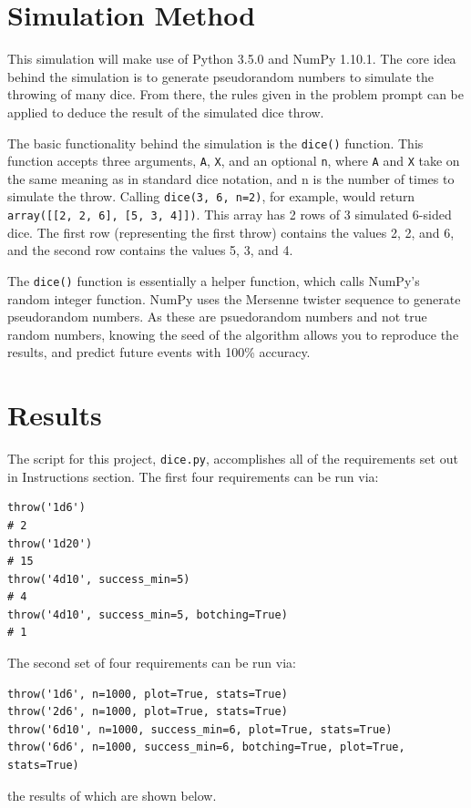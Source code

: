 \documentclass[twocolumn,letterpaper]{article}  %
\begin{document}
\section{Simulation Method}

This simulation will make use of Python 3.5.0 and NumPy 1.10.1. The core idea behind the simulation is to generate pseudorandom numbers to simulate the throwing of many dice. From there, the rules given in the problem prompt can be applied to deduce the result of the simulated dice throw.

The basic functionality behind the simulation is the \texttt{dice()} function. This function accepts three arguments, \texttt{A}, \texttt{X}, and an optional \texttt{n}, where \texttt{A} and \texttt{X} take on the same meaning as in standard dice notation, and n is the number of times to simulate the throw. Calling \texttt{dice(3, 6, n=2)}, for example, would return \texttt{array([[2, 2, 6], [5, 3, 4]])}. This array has 2 rows of 3 simulated 6-sided dice. The first row (representing the first throw) contains the values 2, 2, and 6, and the second row contains the values 5, 3, and 4.

The \texttt{dice()} function is essentially a helper function, which calls NumPy's random integer function. NumPy uses the Mersenne twister sequence to generate pseudorandom numbers. As these are psuedorandom numbers and not true random numbers, knowing the seed of the algorithm allows you to reproduce the results, and predict future events with 100\% accuracy.

\section{Results}

The script for this project, \texttt{dice.py}, accomplishes all of the requirements set out in Instructions section. The first four requirements can be run via:

\begin{lstlisting}
throw('1d6')
# 2
throw('1d20')
# 15
throw('4d10', success_min=5)
# 4
throw('4d10', success_min=5, botching=True)
# 1
\end{lstlisting}

The second set of four requirements can be run via:
\begin{lstlisting}
throw('1d6', n=1000, plot=True, stats=True)
throw('2d6', n=1000, plot=True, stats=True)
throw('6d10', n=1000, success_min=6, plot=True, stats=True)
throw('6d6', n=1000, success_min=6, botching=True, plot=True, stats=True)
\end{lstlisting}
the results of which are shown below.
\end{document}
